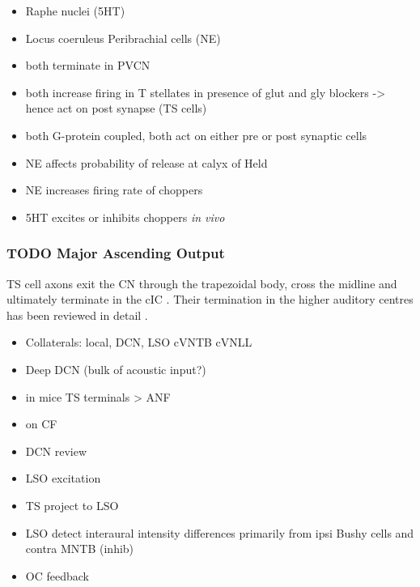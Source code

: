 \begin{itemize}
\item Raphe nuclei (5HT)
\item Locus coeruleus Peribrachial cells (NE)
\item both terminate in PVCN \citep{KlepperHerbert:1991,Thompson:2003,ThompsonLauder:2005,Thompson:2003a,ThompsonWiechmann:2002,BehrensSchofieldEtAl:2002,ThompsonThompson:2001,ThompsonThompson:2001a,ThompsonMooreEtAl:1995,ThompsonThompsonEtAl:1994}
\item both increase firing in T stellates \citep{OertelWrightEtAl:2011} in presence of glut and gly blockers -> hence act on post synapse (TS cells)
\item both G-protein coupled, both act on either pre or post synaptic cells
\item NE affects probability of release at calyx of Held
\item NE increases firing rate of choppers \citep{KosslVater:1989,Ebert:1996}
\item 5HT excites or inhibits choppers \emph{in vivo} \citep{EbertOstwald:1992}
\end{itemize}




\subsubsection{TODO Major Ascending Output}
\label{sec-1_6}


TS cell axons exit the CN through the trapezoidal body, cross the midline and ultimately terminate in the cIC \citep{Adams:1979}. Their termination in the higher auditory centres has been reviewed in detail  \citep{DoucetRyugo:2006,CantBenson:2003}.

\begin{itemize}
\item Collaterals: local, DCN, LSO cVNTB cVNLL \citep{Warr:1969,SmithJorisEtAl:1993,Thompson:1998,DoucetRyugo:2003}
\item Deep DCN (bulk of acoustic input?)
\item in mice TS terminals > ANF \citep{CaoMcGinleyEtAl:2008}
\item on CF \citep{SmithRhode:1989,FriedlandPongstapornEtAl:2003,DoucetRyugo:1997}
\item DCN review \citep{OertelYoung:2004}
\item LSO excitation
\item TS project to LSO \citep{Thompson:1998,DoucetRyugo:2003,ThompsonThompson:1991a}
\item LSO detect interaural intensity differences primarily from ipsi Bushy cells and contra MNTB (inhib)
\item OC feedback
\end{itemize}

